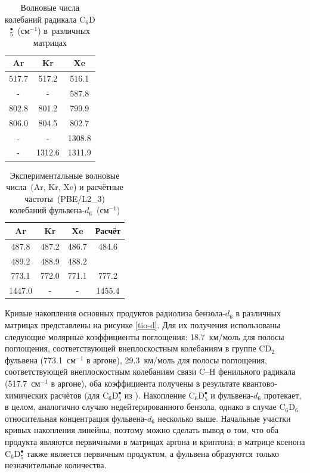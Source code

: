 { \begin{table}[H]
\caption{Волновые числа колебаний радикала C$_6$D$_5^\bullet$~(см$^{-1}$) в~различных матрицах}
\label{C6D5}
\begin{center}
\begin{tabular}{ccc}
Ar & Kr & Xe \\
\hline
517.7 & 517.2 & 516.1 \\
- & - & 587.8 \\
802.8 & 801.2 & 799.9 \\
806.0 & 804.5 & 802.7 \\
- & - & 1308.8 \\
- & 1312.6 & 1311.9 \\
\end{tabular}
\end{center}
\end{table}


 \begin{table}[H]
\caption{Экспериментальные волновые числа~(Ar, Kr, Xe) и расчётные частоты~(PBE/L2\_3) колебаний фульвена-$d_6$~(см$^{-1}$)}
\label{fd6}
\begin{center}
\begin{tabular}{cccc}
Ar & Kr & Xe & Расчёт\\
\hline
487.8 & 487.2 & 486.7 & 484.6\\
489.2 & 488.9 & 488.2 & \\
773.1 & 772.0 & 771.1 & 777.2 \\
1447.0 & - & - & 1455.4\\
\end{tabular}
\end{center}
\end{table}

Кривые накопления основных продуктов радиолиза бензола-$d_6$ в различных матрицах представлены на рисунке \ref{tio-d}. Для их получения использованы следующие молярные коэффициенты поглощения: 18.7~км/моль для полосы поглощения, соответствующей внеплоскостным колебаниям в группе CD$_2$ фульвена (773.1~см$^{-1}$ в аргоне), 29.3~км/моль для полосы поглощения, соответствующей внеплоскостным колебаниям связи C--H фенильного радикала (517.7~см$^{-1}$ в аргоне), оба коэффициента получены в результате квантово-химических расчётов (для C$_6$D$_5^\bullet$ из \cite{Friderichsen2001}). Накопление C$_6$D$_5^\bullet$ и фульвена-$d_6$ протекает, в целом, аналогично случаю недейтерированного бензола, однако в случае C$_6$D$_6$ относительная концентрация фульвена-$d_6$  несколько выше. Начальные участки кривых накопления линейны, поэтому можно сделать вывод о том, что оба продукта являются первичными в матрицах аргона и криптона; в матрице ксенона C$_6$D$_5^\bullet$ также является первичным продуктом, а фульвена образуются только незначительные количества.

}
